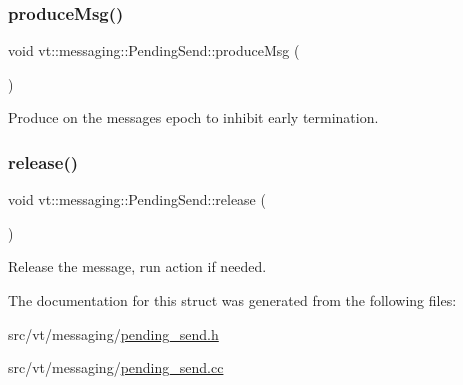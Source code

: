 \mbox{\label{structvt_1_1messaging_1_1_pending_send_af5961bb21b4a427732be91ac699d570b}} 
\subsubsection{\texorpdfstring{produce\+Msg()}{produceMsg()}}
{\footnotesize\ttfamily void vt\+::messaging\+::\+Pending\+Send\+::produce\+Msg (\begin{DoxyParamCaption}{ }\end{DoxyParamCaption})}



Produce on the messages epoch to inhibit early termination. 

\mbox{\label{structvt_1_1messaging_1_1_pending_send_ad4b41412f953dcd22b3e3020a812f757}} 
\subsubsection{\texorpdfstring{release()}{release()}}
{\footnotesize\ttfamily void vt\+::messaging\+::\+Pending\+Send\+::release (\begin{DoxyParamCaption}{ }\end{DoxyParamCaption})\hspace{0.3cm}{\ttfamily [inline]}}



Release the message, run action if needed. 



The documentation for this struct was generated from the following files\+:\begin{DoxyCompactItemize}
\item 
src/vt/messaging/\hyperlink{pending__send_8h}{pending\+\_\+send.\+h}\item 
src/vt/messaging/\hyperlink{pending__send_8cc}{pending\+\_\+send.\+cc}\end{DoxyCompactItemize}
